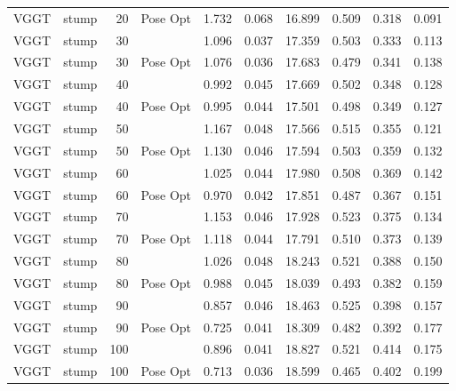 \begin{table}[H]
\begin{tabular}{llrlrrrrrr}
VGGT & stump & 20 & Pose Opt & 1.732 & 0.068 & 16.899 & 0.509 & 0.318 & 0.091 \\
VGGT & stump & 30 &  & 1.096 & 0.037 & 17.359 & 0.503 & 0.333 & 0.113 \\
VGGT & stump & 30 & Pose Opt & 1.076 & 0.036 & 17.683 & 0.479 & 0.341 & 0.138 \\
VGGT & stump & 40 &  & 0.992 & 0.045 & 17.669 & 0.502 & 0.348 & 0.128 \\
VGGT & stump & 40 & Pose Opt & 0.995 & 0.044 & 17.501 & 0.498 & 0.349 & 0.127 \\
VGGT & stump & 50 &  & 1.167 & 0.048 & 17.566 & 0.515 & 0.355 & 0.121 \\
VGGT & stump & 50 & Pose Opt & 1.130 & 0.046 & 17.594 & 0.503 & 0.359 & 0.132 \\
VGGT & stump & 60 &  & 1.025 & 0.044 & 17.980 & 0.508 & 0.369 & 0.142 \\
VGGT & stump & 60 & Pose Opt & 0.970 & 0.042 & 17.851 & 0.487 & 0.367 & 0.151 \\
VGGT & stump & 70 &  & 1.153 & 0.046 & 17.928 & 0.523 & 0.375 & 0.134 \\
VGGT & stump & 70 & Pose Opt & 1.118 & 0.044 & 17.791 & 0.510 & 0.373 & 0.139 \\
VGGT & stump & 80 &  & 1.026 & 0.048 & 18.243 & 0.521 & 0.388 & 0.150 \\
VGGT & stump & 80 & Pose Opt & 0.988 & 0.045 & 18.039 & 0.493 & 0.382 & 0.159 \\
VGGT & stump & 90 &  & 0.857 & 0.046 & 18.463 & 0.525 & 0.398 & 0.157 \\
VGGT & stump & 90 & Pose Opt & 0.725 & 0.041 & 18.309 & 0.482 & 0.392 & 0.177 \\
VGGT & stump & 100 &  & 0.896 & 0.041 & 18.827 & 0.521 & 0.414 & 0.175 \\
VGGT & stump & 100 & Pose Opt & 0.713 & 0.036 & 18.599 & 0.465 & 0.402 & 0.199 \\
\bottomrule
\end{tabular}
\end{table}